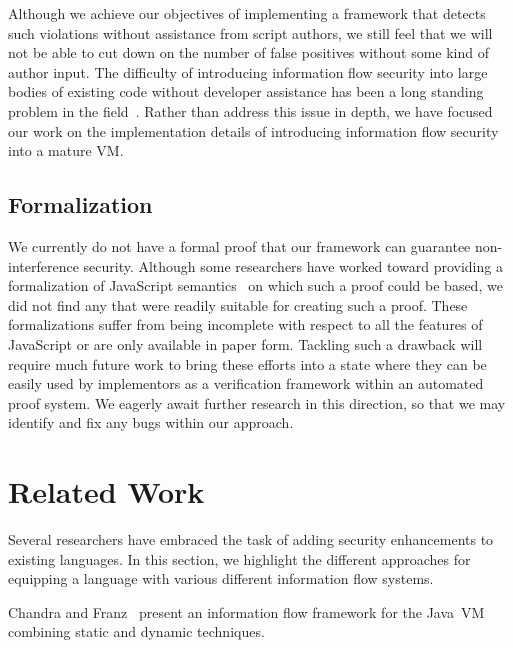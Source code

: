 Although we achieve our objectives of implementing a framework that detects such violations without assistance from script authors,  we still feel that we will not be able to cut down on the number of false positives without some kind of author input.
The difficulty of introducing information flow security into large bodies of existing code without developer assistance has been a long standing problem in the field~\cite{1159651}.
Rather than address this issue in depth, we have focused our work on the implementation details of introducing information flow security into a mature VM.

\subsection{Formalization}

We currently do not have a formal proof that our framework can guarantee non-interference security.
Although some researchers have worked toward providing a formalization of JavaScript semantics~\cite{yu2007javascript, herman2007status, maffeis2008operational, guha2010essence} on which such a proof could be based, we did not find any that were readily suitable for creating such a proof.
These formalizations suffer from being incomplete with respect to all the features of JavaScript or are only available in paper form.
Tackling such a drawback will require much future work to bring these efforts into a state where they can be easily used by implementors as a verification framework within an automated proof system.
We eagerly await further research in this direction, so that we may identify and fix any bugs within our approach.




\section{Related Work}
\label{sec:relatedwork}

Several researchers have embraced the task of adding security enhancements to existing languages.
In this section, we highlight the different approaches for equipping a language with various different information flow systems.

Chandra and Franz~\cite{10.1109/ACSAC.2007.37} present an information flow framework for the Java~VM combining static and dynamic techniques.


